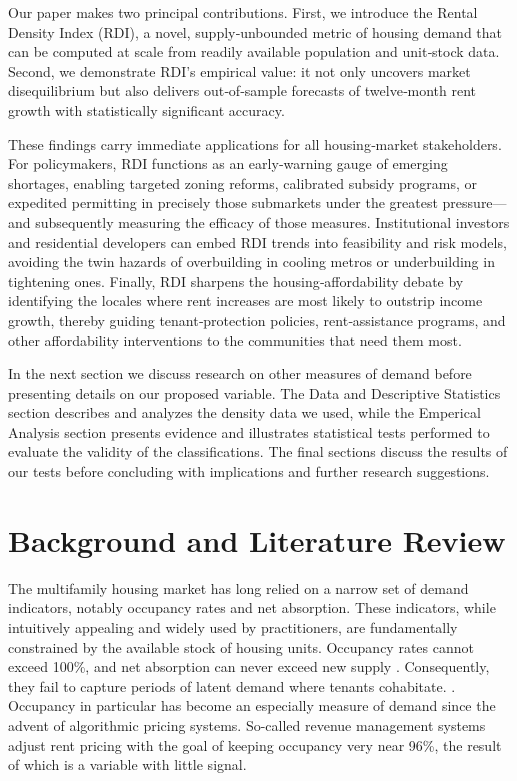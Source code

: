 \documentclass[APA,Times1COL]{WileyNJDv5} %
\begin{document}
Our paper makes two principal contributions. First, we introduce the Rental Density Index (RDI), a novel, supply‑unbounded metric of housing demand that can be computed at scale from readily available population and unit‐stock data. Second, we demonstrate RDI’s empirical value: it not only uncovers market disequilibrium but also delivers out‑of‑sample forecasts of twelve‑month rent growth with statistically significant accuracy.

These findings carry immediate applications for all housing‐market stakeholders. For policymakers, RDI functions as an early‑warning gauge of emerging shortages, enabling targeted zoning reforms, calibrated subsidy programs, or expedited permitting in precisely those submarkets under the greatest pressure—and subsequently measuring the efficacy of those measures. Institutional investors and residential developers can embed RDI trends into feasibility and risk models, avoiding the twin hazards of overbuilding in cooling metros or underbuilding in tightening ones. Finally, RDI sharpens the housing‐affordability debate by identifying the locales where rent increases are most likely to outstrip income growth, thereby guiding tenant‐protection policies, rent‐assistance programs, and other affordability interventions to the communities that need them most.

In the next section we discuss research on other measures of demand before presenting details on our proposed variable. The Data and Descriptive Statistics section describes and analyzes the density data we used, while the Emperical Analysis section presents evidence and illustrates statistical tests performed to evaluate the validity of the classifications. The final sections discuss the results of our tests before concluding with implications and further research suggestions. 

\section{Background and Literature Review}\label{sec2}

The multifamily housing market has long relied on a narrow set of demand indicators, notably occupancy rates and net absorption. These indicators, while intuitively appealing and widely used by practitioners, are fundamentally constrained by the available stock of housing units. Occupancy rates cannot exceed 100\%, and net absorption can never exceed new supply \cite{mueller1999real, gabriel2001rental}. Consequently, they fail to capture periods of latent demand where tenants cohabitate. \cite{sirmans1991determinants, pyhrr1999real}. Occupancy in particular has become an especially measure of demand since the advent of algorithmic pricing systems. So-called revenue management systems adjust rent pricing with the goal of keeping occupancy very near 96\%, \cite{calder2024coordinated} the result of which is a variable with little signal. 
\end{document}
